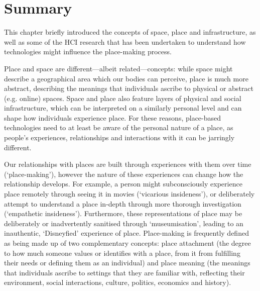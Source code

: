 \section{Summary}

This chapter briefly introduced the concepts of space, place and infrastructure, as well as some of the HCI research that has been undertaken to understand how technologies might influence the place-making process.

Place and space are different---albeit related---concepts: while space might describe a geographical area which our bodies can perceive, place is much more abstract, describing the meanings that individuals ascribe to physical or abstract (e.g. online) spaces. Space and place also feature layers of physical and social infrastructure, which can be interpreted on a similarly personal level and can shape how individuals experience place. For these reasons, place-based technologies need to at least be aware of the personal nature of a place, as people's experiences, relationships and interactions with it can be jarringly different.

Our relationships with places are built through experiences with them over time (`place-making'), however the nature of these experiences can change how the relationship develops. For example, a person might subconsciously experience place remotely through seeing it in movies (`vicarious insideness'), or deliberately attempt to understand a place in-depth through more thorough investigation (`empathetic insideness'). Furthermore, these representations of place may be deliberately or inadvertently sanitised through `museumisation', leading to an inauthentic, `Disneyfied' experience of place. Place-making is frequently defined as being made up of two complementary concepts: place attachment (the degree to how much someone values or identifies with a place, from it from fulfilling their needs or defining them as an individual) and place meaning (the meanings that individuals ascribe to settings that they are familiar with, reflecting their environment, social interactions, culture, politics, economics and history). 

